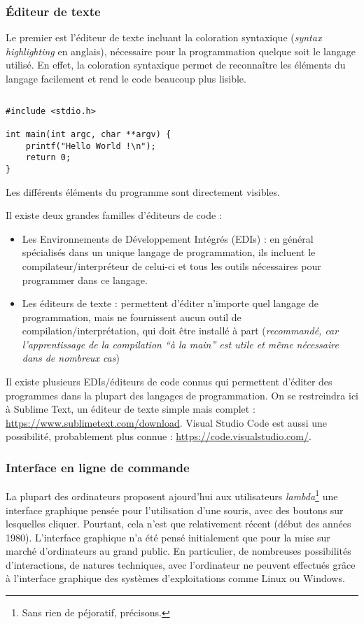 \documentclass[../../main.tex]{subfiles}
\begin{document}
\subsubsection{Éditeur de texte}
Le premier est l'éditeur de texte incluant la coloration syntaxique (\textit{syntax highlighting} en anglais), nécessaire pour la programmation quelque soit le langage utilisé. En effet, la coloration syntaxique permet de reconnaître les éléments du langage facilement et rend le code beaucoup plus lisible.
\begin{lstlisting}[title=Un premier programme]
\end{lstlisting}
\begin{verbatim}
#include <stdio.h>

int main(int argc, char **argv) {
	printf("Hello World !\n");
	return 0;
}
\end{verbatim}
Les différents éléments du programme sont directement visibles.

Il existe deux grandes familles d'éditeurs de code :
\begin{itemize}
	\item Les Environnements de Développement Intégrés (EDIs) : en général spécialisés dans un unique langage de programmation, ils incluent le compilateur/interpréteur de celui-ci et tous les outils nécessaires pour programmer dans ce langage.
	\item Les éditeurs de texte : permettent d'éditer n'importe quel langage de programmation, mais ne fournissent aucun outil de compilation/interprétation, qui doit être installé à part (\textit{recommandé, car l'apprentissage de la compilation ``à la main'' est utile et même nécessaire dans de nombreux cas})
\end{itemize}
Il existe plusieurs EDIs/éditeurs de code connus qui permettent d'éditer des programmes dans la plupart des langages de programmation. On se restreindra ici à Sublime Text, un éditeur de texte simple mais complet : \url{https://www.sublimetext.com/download}. Visual Studio Code est aussi une possibilité, probablement plus connue : \url{https://code.visualstudio.com/}.
\subsubsection{Interface en ligne de commande}
La plupart des ordinateurs proposent ajourd'hui aux utilisateurs \textit{lambda}\footnote{Sans rien de péjoratif, précisons.} une interface graphique pensée pour l'utilisation d'une souris, avec des boutons sur lesquelles cliquer. Pourtant, cela n'est que relativement récent (début des années 1980). L'interface graphique n'a été pensé initialement que pour la mise sur marché d'ordinateurs au grand public. En particulier, de nombreuses possibilités d'interactions, de natures techniques, avec l'ordinateur ne peuvent effectués grâce à l'interface graphique des systèmes d'exploitations comme Linux ou Windows.
\end{document}
